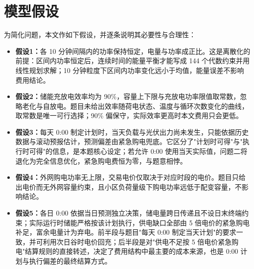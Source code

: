 
\section{模型假设}

为简化问题，本文作如下假设，并逐条说明其必要性与合理性：

\begin{itemize}[itemindent=2em,itemsep=1pt,topsep=2pt,parsep=0pt]
\item \textbf{假设1：}各 10 分钟间隔内的功率保持恒定，电量与功率成正比。这是离散化的前提：区间内功率恒定后，连续时间的能量平衡才能写成 144 个代数约束并用线性规划求解；10 分钟粒度下区间内功率变化远小于均值，能量误差不影响费用结论。
\item \textbf{假设2：}储能充放电效率均为 90\%，容量上下限与充放电功率限值取常数，忽略老化与自放电。题目未给出效率随荷电状态、温度与循环次数变化的曲线，取常数是唯一可行选择；90\% 偏保守，实际效率更高时本文费用只会更低。
\item \textbf{假设3：}每天 0:00 制定计划时，当天负载与光伏出力尚未发生，只能依据历史数据与滚动预报估计，预测偏差由紧急购电兜底。它区分了"计划时可得"与"执行时可得"的信息，是本题核心设定；若允许 0:00 使用当天实际值，问题二将退化为完全信息优化，紧急购电费恒为零，与题意相悖。
\item \textbf{假设4：}外网购电功率无上限，交易电价仅取决于对应时段的电价。题目只给出电价而无外网容量约束，且小区负荷量级下购电功率远低于配变容量，不影响结论。
\item \textbf{假设5：}各日 0:00 依据当日预测独立决策，储电量跨日传递且不设日末终端约束；实际运行时储能严格按该计划执行，供电缺口全部由 5 倍电价的紧急购电补足，富余电量计为弃电。前半段与题目"每天 0:00 制定当天计划"的要求一致，并可利用次日谷时电价回充；后半段是对"供电不足按 5 倍电价紧急购电"结算规则的直接转述，决定了费用结构中最主要的成本来源，也是 0:00 计划与执行偏差的最终结算方式。
\end{itemize}
